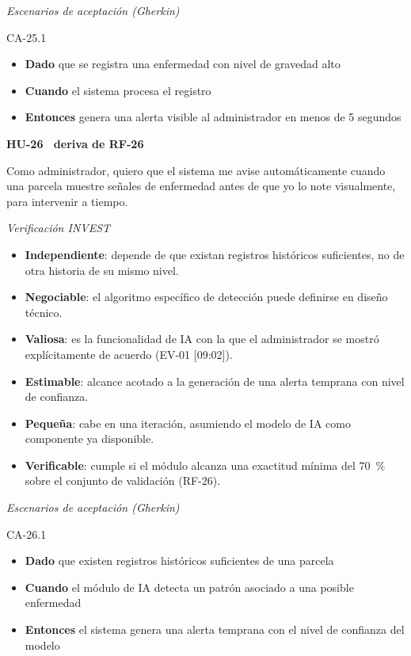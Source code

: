 \documentclass[12pt,a4paper]{article}
\begin{document}
\smallskip
\noindent\textit{Escenarios de aceptación (Gherkin)}

\noindent CA-25.1
\begin{itemize}
\item[] \textbf{Dado} que se registra una enfermedad con nivel de gravedad alto
\item[] \textbf{Cuando} el sistema procesa el registro
\item[] \textbf{Entonces} genera una alerta visible al administrador en menos de 5 segundos
\end{itemize}

\bigskip
\noindent\textbf{HU-26 \textperiodcentered\ deriva de RF-26}

\smallskip
\noindent Como administrador, quiero que el sistema me avise automáticamente cuando una parcela muestre señales de enfermedad antes de que yo lo note visualmente, para intervenir a tiempo.

\smallskip
\noindent\textit{Verificación INVEST}
\begin{itemize}
\item \textbf{Independiente}: depende de que existan registros históricos suficientes, no de otra historia de su mismo nivel.
\item \textbf{Negociable}: el algoritmo específico de detección puede definirse en diseño técnico.
\item \textbf{Valiosa}: es la funcionalidad de IA con la que el administrador se mostró explícitamente de acuerdo (EV-01 [09:02]).
\item \textbf{Estimable}: alcance acotado a la generación de una alerta temprana con nivel de confianza.
\item \textbf{Pequeña}: cabe en una iteración, asumiendo el modelo de IA como componente ya disponible.
\item \textbf{Verificable}: cumple si el módulo alcanza una exactitud mínima del 70~\% sobre el conjunto de validación (RF-26).
\end{itemize}

\smallskip
\noindent\textit{Escenarios de aceptación (Gherkin)}

\noindent CA-26.1
\begin{itemize}
\item[] \textbf{Dado} que existen registros históricos suficientes de una parcela
\item[] \textbf{Cuando} el módulo de IA detecta un patrón asociado a una posible enfermedad
\item[] \textbf{Entonces} el sistema genera una alerta temprana con el nivel de confianza del modelo
\end{itemize}



\end{document}
